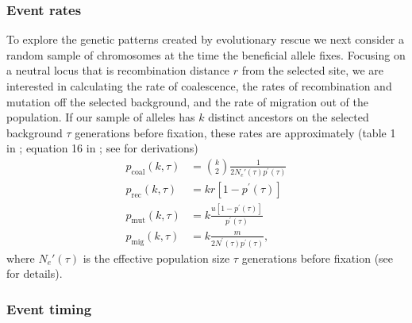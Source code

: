 \documentclass[]{article}
\begin{document}
\subsubsection*{Event rates}
\label{sec:rescue_backward}

To explore the genetic patterns created by evolutionary rescue we next consider a random sample of chromosomes at the time the beneficial allele fixes.
Focusing on a neutral locus that is recombination distance $r$ from the selected site, we are interested in calculating the rate of coalescence, the rates of recombination and mutation off the selected background, and the rate of migration out of the population.
If our sample of alleles has $k$ distinct ancestors on the selected background $\tau$ generations before fixation, these rates are approximately (table 1 in \citealp{hudson1988coalescent}; equation 16 in \citealp{pennings2006soft2}; see  for derivations)
\begin{equation}\label{eq:coal_rates}
\begin{aligned}
p_{\mathrm{coal}}(k,\tau) &= \binom{k}{2} \frac{1}{2N_e'(\tau) p^\prime(\tau)}\\
p_{\mathrm{rec}}(k,\tau) &= k r [1 - p^\prime(\tau)]\\
p_{\mathrm{mut}}(k,\tau) &= k \frac{u [1 - p^\prime(\tau)]}{p^\prime(\tau)}\\
p_{\mathrm{mig}}(k,\tau) &= k \frac{m}{2N^\prime(\tau)p^\prime(\tau)},
\end{aligned}
\end{equation} 
where $N_e'(\tau)$ is the effective population size $\tau$ generations before fixation (see  for details).

\subsubsection*{Event timing}
\end{document}
